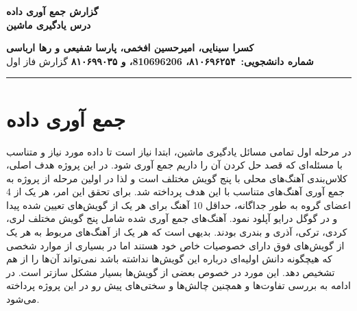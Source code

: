 
\def \Subject {گزارش جمع آوری داده }
\def \Course {درس یادگیری ماشین}
\def \Author {کسرا سینایی، امیرحسین افخمی، پارسا شفیعی و رها ارباسی }
\def \Report {گزارش فاز اول}
\def \StudentNumber {۸۱۰۶۹۶۲۵۴، 810696206، و ۸۱۰۶۹۹۰۳۵}

\begin{center}
\vspace{.4cm}
{\bf {\huge \Subject}}\\
{\bf \Large \Course}
\vspace{.2cm}
\end{center}
{\bf \Author }  \\
{\bf شماره دانشجویی:\ \StudentNumber}
\hspace{\fill} 
{\Large \Report} \\
\hrule
\vspace{0.8cm}

\clearpage


\section{جمع آوری داده}
در مرحله اول تمامی مسائل یادگیری ماشین، ابتدا نیاز است تا داده مورد نیاز و متناسب با مسئله‌ای که قصد حل کردن آن را داریم جمع آوری شود.
در این پروژه هدف اصلی، کلاس‌بندی آهنگ‌های محلی با پنج گویش مختلف است و لذا در اولین مرحله از پروژه به جمع آوری آهنگ‌های متناسب با این هدف پرداخته شد.
برای تحقق این امر، هر یک از 4 اعضای گروه به طور جداگانه، حداقل 10 آهنگ برای هر یک از گویش‌های تعیین شده پیدا و در گوگل درایو آپلود نمود.
آهنگ‌های جمع آوری شده شامل پنج گویش مختلف لری، کردی، ترکی، آذری و بندری بودند.
بدیهی است که هر یک از آهنگ‌های مربوط به هر یک از گویش‌های فوق دارای خصوصیات خاص خود هستند اما در بسیاری از موارد شخصی که هیچگونه دانش اولیه‌ای درباره این گویش‌ها نداشته باشد
نمی‌تواند آن‌ها را از هم تشخیص دهد. این مورد در خصوص بعضی از گویش‌ها بسیار مشکل سازتر است. در ادامه به بررسی تفاوت‌ها و همچنین چالش‌ها و سختی‌های پیش رو در این پروژه پرداخته می‌شود.

